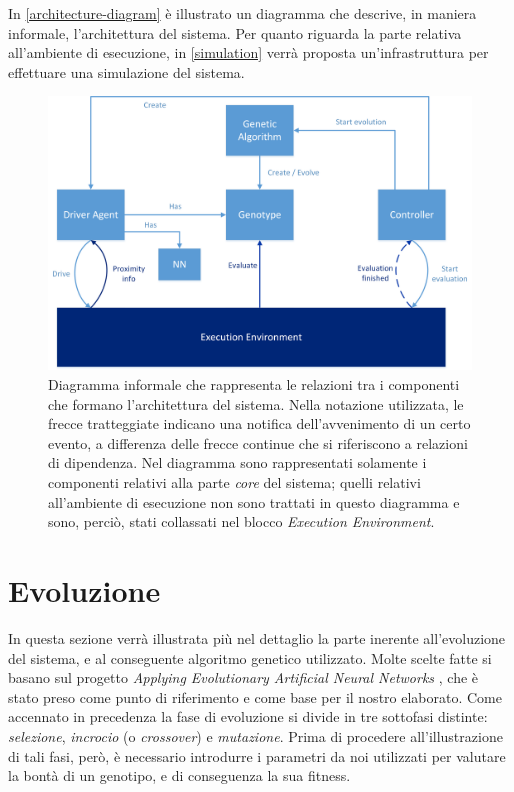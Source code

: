 \documentclass[a4paper,12pt]{article}
\begin{document}
In \autoref{architecture-diagram} è illustrato un diagramma che descrive, in maniera informale, l'architettura del sistema. Per quanto riguarda la parte relativa all'ambiente di esecuzione, in \autoref{simulation} verrà proposta un'infrastruttura per effettuare una simulazione del sistema.

\begin{figure}[H]
	\centering
	\includegraphics[width=130mm]{./img/architecture.png}
	\caption{Diagramma informale che rappresenta le relazioni tra i componenti che formano l'architettura del sistema. Nella notazione utilizzata, le frecce tratteggiate indicano una notifica dell'avvenimento di un certo evento, a differenza delle frecce continue che si riferiscono a relazioni di dipendenza. Nel diagramma sono rappresentati solamente i componenti relativi alla parte \emph{core} del sistema; quelli relativi all'ambiente di esecuzione non sono trattati in questo diagramma e sono, perciò, stati collassati nel blocco \emph{Execution Environment}.  \label{architecture-diagram}}
\end{figure}

\section{Evoluzione} \label{evolution}
In questa sezione verrà illustrata più nel dettaglio la parte inerente all'evoluzione del sistema, e al conseguente algoritmo genetico utilizzato. Molte scelte fatte si basano sul progetto \emph{Applying Evolutionary Artificial Neural Networks} \cite{arztRepo}, che è stato preso come punto di riferimento e come base per il nostro elaborato. Come accennato in precedenza la fase di evoluzione si divide in tre sottofasi distinte: \emph{selezione}, \emph{incrocio} (o \emph{crossover}) e \emph{mutazione}. Prima di procedere all'illustrazione di tali fasi, però, è necessario introdurre i parametri da noi utilizzati per valutare la bontà di un genotipo, e di conseguenza la sua fitness.
\end{document}
